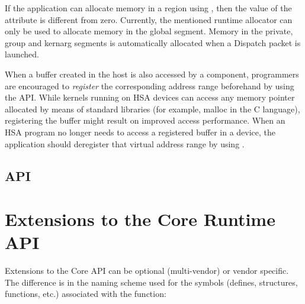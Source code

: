 \documentclass[final]{book}
\begin{document}
If the application can allocate memory in a region using
, then the value of the attribute
 is different from zero. Currently, the
mentioned runtime allocator can only be used to allocate memory in the global
segment. Memory in the private, group and kernarg segments is automatically
allocated when a Dispatch packet is launched.

When a buffer created in the host is also accessed by a component, programmers
are encouraged to \emph{register} the corresponding address range beforehand by
using the  API. While kernels running on HSA devices
can access any memory pointer allocated by means of standard libraries (for
example, malloc in the C language), registering the buffer might result on
improved access performance.  When an HSA program no longer needs to access a
registered buffer in a device, the application should deregister that virtual
address range by using .


\subsection{API}



% 


\section{Extensions to the Core Runtime API}\label{extensions}

Extensions to the Core API can be optional (multi-vendor) or vendor
specific. The difference is in the naming scheme used for the symbols (defines,
structures, functions, etc.) associated with the function:
\end{document}
